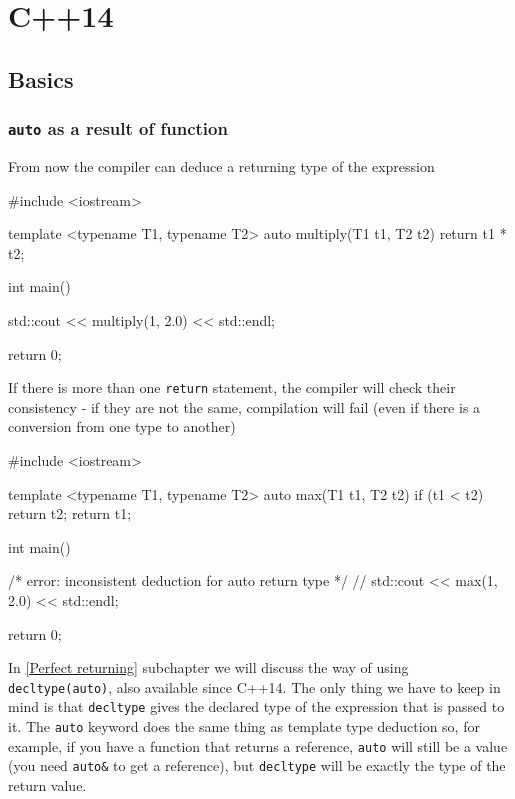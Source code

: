 \documentclass[../main]{subfiles}
\begin{document}
\chapter{C++14}
\section{Basics}
\subsection{\texttt{auto} as a result of function}
    From now the compiler can deduce a returning type of the expression
\begin{Code}
    #include <iostream>
    
    template <typename T1, typename T2>
    auto multiply(T1 t1, T2 t2)
    {
        return t1 * t2;
    }
    
    int main()
    {
        std::cout << multiply(1, 2.0) << std::endl;
    
        return 0;
    }
\end{Code}
\noindent
If there is more than one \texttt{return} statement, the compiler will check their consistency - if they are not the same, compilation will fail
(even if there is a conversion from one type to another)
\begin{Code}
    #include <iostream>
    
    template <typename T1, typename T2>
    auto max(T1 t1, T2 t2)
    {
        if (t1 < t2)
        {
            return t2;
        }
        return t1;
    }
    
    int main()
    {
        /* error: inconsistent deduction for auto return type */
        // std::cout << max(1, 2.0) << std::endl;
    
        return 0;
    }
\end{Code}

    In \ref{Perfect returning} subchapter we will discuss the way of using \texttt{decltype(auto)}, also available since C++14. The only thing
    we have to keep in mind is that \texttt{decltype} gives the declared type of the expression that is passed to it. The \texttt{auto}
    keyword does the same thing as template type deduction so, for example, if you have a function that returns a reference, \texttt{auto} will
    still be a value (you need \texttt{auto\&} to get a reference), but \texttt{decltype} will be exactly the type of the return value.
\end{document}
